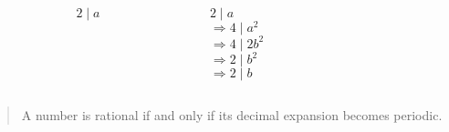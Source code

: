 \begin{frame}
  \begin{columns}
    \begin{column}{0.3\textwidth}
      \color{gmitblue} \fontsize{30}{10}
      \[2 \mid a\]
    \end{column}
    {\color{gmitgrey!30}\vrule{}} \hspace{0.1\textwidth}
    \begin{column}{0.5\textwidth}
      $2 \mid a$ \\[8mm]
      $\Rightarrow 4 \mid a^2$ \\[8mm]
      $\Rightarrow 4 \mid 2b^2$ \\[8mm]
      $\Rightarrow 2 \mid b^2$ \\[8mm]
      $\Rightarrow 2 \mid b$
    \end{column}
  \end{columns}
\end{frame}

\begin{frame}[standout]

\begin{quote}
  A number is rational if and only if its decimal expansion becomes periodic.
\end{quote}

\end{frame}
